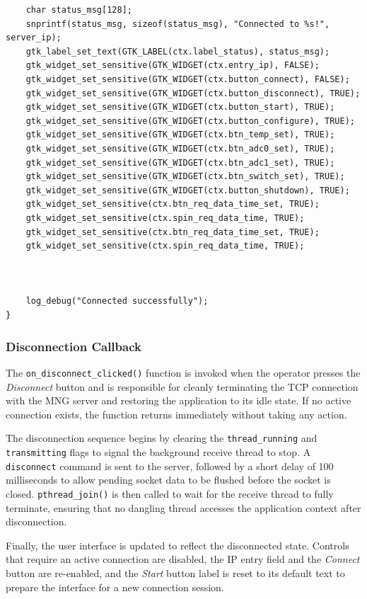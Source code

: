 \begin{verbatim}
    char status_msg[128];
    snprintf(status_msg, sizeof(status_msg), "Connected to %s!", server_ip);
    gtk_label_set_text(GTK_LABEL(ctx.label_status), status_msg);
    gtk_widget_set_sensitive(GTK_WIDGET(ctx.entry_ip), FALSE);
    gtk_widget_set_sensitive(GTK_WIDGET(ctx.button_connect), FALSE);
    gtk_widget_set_sensitive(GTK_WIDGET(ctx.button_disconnect), TRUE);
    gtk_widget_set_sensitive(GTK_WIDGET(ctx.button_start), TRUE);
    gtk_widget_set_sensitive(GTK_WIDGET(ctx.button_configure), TRUE);
    gtk_widget_set_sensitive(GTK_WIDGET(ctx.btn_temp_set), TRUE);
    gtk_widget_set_sensitive(GTK_WIDGET(ctx.btn_adc0_set), TRUE);
    gtk_widget_set_sensitive(GTK_WIDGET(ctx.btn_adc1_set), TRUE);
    gtk_widget_set_sensitive(GTK_WIDGET(ctx.btn_switch_set), TRUE);
    gtk_widget_set_sensitive(GTK_WIDGET(ctx.button_shutdown), TRUE);
    gtk_widget_set_sensitive(ctx.btn_req_data_time_set, TRUE);
    gtk_widget_set_sensitive(ctx.spin_req_data_time, TRUE);
    gtk_widget_set_sensitive(ctx.btn_req_data_time_set, TRUE);
    gtk_widget_set_sensitive(ctx.spin_req_data_time, TRUE);



    log_debug("Connected successfully");
}
\end{verbatim}

\subsubsection{Disconnection Callback}

The \texttt{on\_disconnect\_clicked()} function is invoked when the
operator presses the \textit{Disconnect} button and is responsible for
cleanly terminating the TCP connection with the MNG server and restoring
the application to its idle state. If no active connection exists, the
function returns immediately without taking any action.

The disconnection sequence begins by clearing the \texttt{thread\_running}
and \texttt{transmitting} flags to signal the background receive thread
to stop. A \texttt{disconnect} command is sent to the server, followed by
a short delay of 100 milliseconds to allow pending socket data to be
flushed before the socket is closed. \texttt{pthread\_join()} is then
called to wait for the receive thread to fully terminate, ensuring that
no dangling thread accesses the application context after disconnection.

Finally, the user interface is updated to reflect the disconnected state.
Controls that require an active connection are disabled, the IP entry
field and the \textit{Connect} button are re-enabled, and the
\textit{Start} button label is reset to its default text to prepare the
interface for a new connection session.

